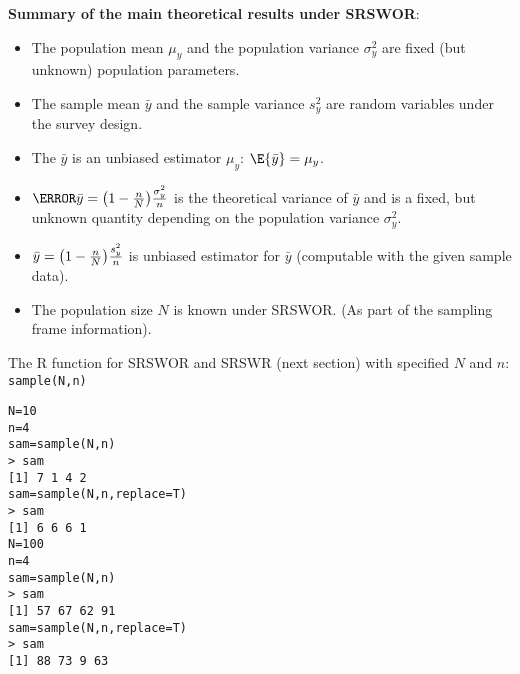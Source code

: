 \textbf{Summary of the main theoretical results under SRSWOR}:
\begin{itemize}
      \item The population mean $ \mu_y $ and the population variance
            $ \sigma_y^2 $ are fixed (but unknown) population parameters.
      \item The sample mean $ \bar{y} $ and the sample variance $ s_y^2 $
            are random variables under the survey design.
      \item The $ \bar{y} $ is an unbiased estimator $ \mu_y $: $ \E{\bar{y}}=\mu_y $.
      \item $ \V{\bar{y}}=\bigl(1-\frac{n}{N}\bigr)\frac{\sigma_y^2}{n} $
            is the theoretical variance of $ \bar{y} $ and is a fixed, but unknown
            quantity depending on the population variance $ \sigma_y^2 $.
      \item $ \relax{\bar{y}}=\bigl(1-\frac{n}{N}\bigr)\frac{s_y^2}{n} $
            is unbiased estimator for $ \bar{y} $ (computable with the given sample data).
      \item The population size $ N $ is known under SRSWOR\@. (As part of the sampling
            frame information).
\end{itemize}

The R function for SRSWOR and SRSWR (next section) with
specified $N$ and $n$: \texttt{sample(N,n)}
\begin{verbatim}
N=10
n=4
sam=sample(N,n)
> sam
[1] 7 1 4 2
sam=sample(N,n,replace=T)
> sam
[1] 6 6 6 1
N=100
n=4
sam=sample(N,n)
> sam
[1] 57 67 62 91
sam=sample(N,n,replace=T)
> sam
[1] 88 73 9 63
\end{verbatim}
